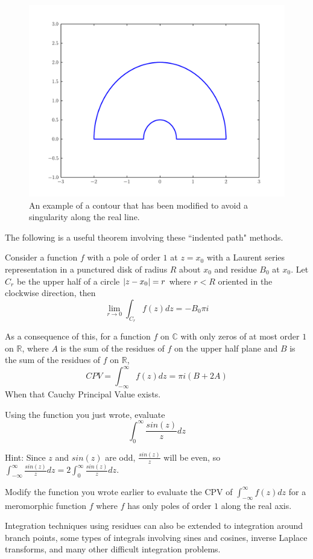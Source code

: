 \begin{figure}
\includegraphics[width=\textwidth]{contour2.pdf}
\caption{An example of a contour that has been modified to avoid a singularity along the real line.}
\label{complexint:c2}
\end{figure}

The following is a useful theorem involving these ``indented path" methods.
\begin{theorem}
Consider a function $f$ with a pole of order $1$ at $z=x_0$ with a Laurent series representation in a punctured disk of radius $R$ about $x_0$ and residue $B_0$ at $x_0$.
Let $C_r$ be the upper half of a circle $\left\lvert z-x_0\right\rvert=r$ where $r<R$ oriented in the clockwise direction, then
$$\lim_{r\to 0} \int_{C_r} f(z) dz = - B_0 \pi i$$
\end{theorem}
As a consequence of this, for a function $f$ on $\mathbb{C}$ with only zeros of at most order $1$ on $\mathbb{R}$, where $A$ is the sum of the residues of $f$ on the upper half plane and $B$ is the sum of the residues of $f$ on $\mathbb{R}$, 
$$CPV = \int_{-\infty}^{\infty} f(z) dz = \pi i (B+2A)$$ 
When that Cauchy Principal Value exists.

\begin{problem}
Using the function you just wrote, evaluate
$$\int_{0}^{\infty} \frac{sin(z)}{z} dz$$

Hint: Since $z$ and $sin(z)$ are odd, $\frac{sin(z)}{z}$ will be even, so 
$\int_{-\infty}^{\infty} \frac{sin(z)}{z} dz = 2 \int_{0}^{\infty} \frac{sin(z)}{z} dz$.
\end{problem}


\begin{problem}
Modify the function you wrote earlier to evaluate the CPV of $\int_{-\infty}^{\infty} f(z) dz$ for a meromorphic function $f$ where $f$ has only poles of order $1$ along the real axis.
\end{problem}

Integration techniques using residues can also be extended to integration around branch points, some types of integrals involving sines and cosines, inverse Laplace transforms, and many other difficult integration problems.
